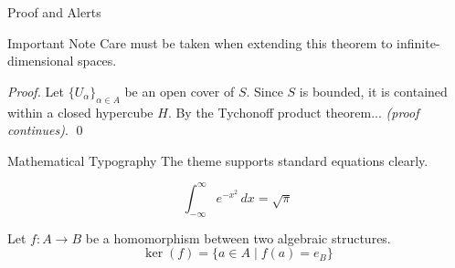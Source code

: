 \documentclass[aspectratio=169, 10pt]{beamer}
\begin{document}
\begin{frame}{Proof and Alerts}
    \begin{alertblock}{Important Note}
        Care must be taken when extending this theorem to infinite-dimensional spaces.
    \end{alertblock}

    \begin{proof}
        Let $\{U_\alpha\}_{\alpha \in A}$ be an open cover of $S$. Since $S$ is bounded, it is contained within a closed hypercube $H$. By the Tychonoff product theorem... \textit{(proof continues)}.
        \qed
    \end{proof}
\end{frame}

\begin{frame}{Mathematical Typography}
    The theme supports standard equations clearly.
    
    \begin{equation}
        \int_{-\infty}^{\infty} e^{-x^2} \, dx = \sqrt{\pi}
    \end{equation}
    
    Let $f: A \to B$ be a homomorphism between two algebraic structures.
    \[
        \ker(f) = \{ a \in A \mid f(a) = e_B \}
    \]
\end{frame}
\end{document}
